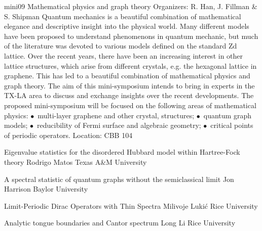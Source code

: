 \mini
{mini09}
{Mathematical physics and graph theory}
{Organizers: R. Han, J. Fillman \& S. Shipman}
{Quantum mechanics is a beautiful combination of mathematical elegance and descriptive insight into the physical world. Many different models have been proposed to understand phenomenons in quantum mechanic, but much of the literature was devoted to various models defined on the standard Zd lattice. Over the recent years, there have been an increasing interest in other lattice structures, which arise from different crystals, e.g. the hexagonal lattice in graphene. This has led to a beautiful combination of mathematical physics and graph theory. The aim of this mini-symposium intends to bring in experts in the TX-LA area to discuss and exchange insights over the recent developments. The proposed mini-symposium will be focused on the following areas of mathematical physics: $\bullet$~multi-layer graphene and other crystal,  structures; $\bullet$~quantum graph models; $\bullet$~reducibility of Fermi surface and algebraic geometry; $\bullet$~critical points of periodic operators.}
{Location: CBB 104}

\begin{talks}
\item\talk
{Eigenvalue statistics for the disordered Hubbard model within Hartree-Fock theory}
{Rodrigo Matos}
{Texas A\&M University}
\item\talk
{A spectral statistic of quantum graphs without the semiclassical limit}
{Jon Harrison}
{Baylor University}
\item\talk
{Limit-Periodic Dirac Operators with Thin Spectra}
{Milivoje Lukić}
{Rice University}
\item\talk
{Analytic tongue boundaries and Cantor spectrum}
{Long Li}
{Rice University}
\end{talks}
\room
